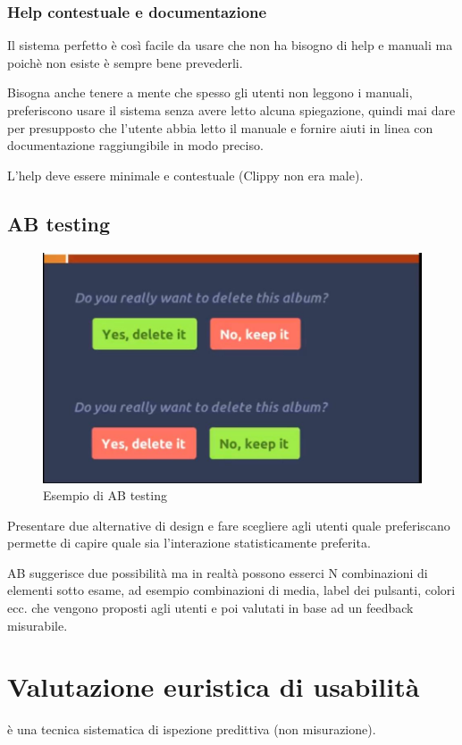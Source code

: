 \documentclass[11pt,a4paper]{book}
\begin{document}
\subsubsection{Help contestuale e documentazione}
Il sistema perfetto è così facile da usare che non ha bisogno di help e manuali ma poichè non esiste è sempre bene prevederli.

Bisogna anche tenere a mente che spesso gli utenti non leggono i manuali, preferiscono usare il sistema senza avere letto alcuna spiegazione, quindi mai dare per presupposto che l'utente abbia letto il manuale e fornire aiuti in linea con documentazione raggiungibile in modo preciso.

L'help deve essere minimale e contestuale (Clippy non era male).

\subsection{AB testing}
\begin{figure}[h!]
	\begin{center}
		\includegraphics[scale=0.6]{img/019.jpg}
		\caption{Esempio di AB testing}
		\label{fig: 019}
	\end{center}
\end{figure}
Presentare due alternative di design e fare scegliere agli utenti quale preferiscano permette di capire quale sia l'interazione statisticamente preferita.

AB suggerisce due possibilità ma in realtà possono esserci N combinazioni di elementi sotto esame, ad esempio combinazioni di media, label dei pulsanti, colori ecc. che vengono proposti agli utenti e poi valutati in base ad un feedback misurabile.

\section{Valutazione euristica di usabilità}
è una tecnica sistematica di ispezione predittiva (non misurazione).
\end{document}
